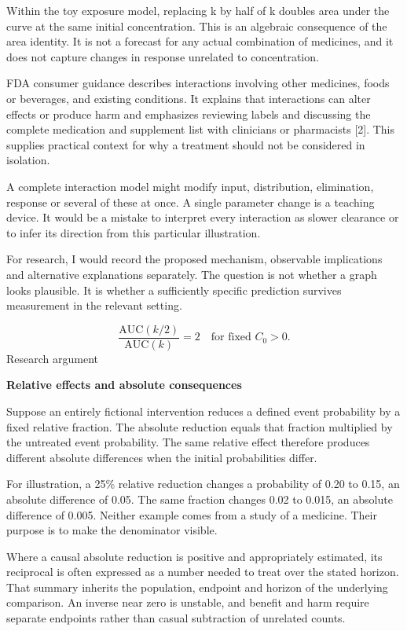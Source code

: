 \documentclass[10pt]{article}
\begin{document}
Within the toy exposure model, replacing k by half of k doubles area under the curve at the same initial concentration. This is an algebraic consequence of the area identity. It is not a forecast for any actual combination of medicines, and it does not capture changes in response unrelated to concentration.\par
FDA consumer guidance describes interactions involving other medicines, foods or beverages, and existing conditions. It explains that interactions can alter effects or produce harm and emphasizes reviewing labels and discussing the complete medication and supplement list with clinicians or pharmacists [2]. This supplies practical context for why a treatment should not be considered in isolation.\par
A complete interaction model might modify input, distribution, elimination, response or several of these at once. A single parameter change is a teaching device. It would be a mistake to interpret every interaction as slower clearance or to infer its direction from this particular illustration.\par
For research, I would record the proposed mechanism, observable implications and alternative explanations separately. The question is not whether a graph looks plausible. It is whether a sufficiently specific prediction survives measurement in the relevant setting.\par
\[\frac{\mathrm{AUC}(k/2)}{\mathrm{AUC}(k)}=2\quad\text{for fixed }C_0>0.\]
\clearpage
{\small\color{accent}Research argument}\par
{\LARGE\bfseries\color{ink}Relative effects and absolute consequences}\par\vspace{7pt}
Suppose an entirely fictional intervention reduces a defined event probability by a fixed relative fraction. The absolute reduction equals that fraction multiplied by the untreated event probability. The same relative effect therefore produces different absolute differences when the initial probabilities differ.\par
For illustration, a 25\% relative reduction changes a probability of 0.20 to 0.15, an absolute difference of 0.05. The same fraction changes 0.02 to 0.015, an absolute difference of 0.005. Neither example comes from a study of a medicine. Their purpose is to make the denominator visible.\par
Where a causal absolute reduction is positive and appropriately estimated, its reciprocal is often expressed as a number needed to treat over the stated horizon. That summary inherits the population, endpoint and horizon of the underlying comparison. An inverse near zero is unstable, and benefit and harm require separate endpoints rather than casual subtraction of unrelated counts.\par
\end{document}
